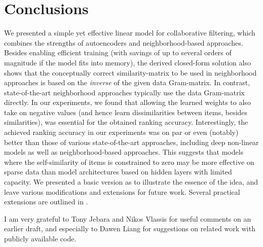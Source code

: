 \documentclass[sigconf]{acmart}
\begin{document}
\section{Conclusions}
We presented a simple yet effective linear model for collaborative filtering, which combines the strengths of autoencoders and neighborhood-based approaches.
 Besides enabling efficient training (with savings of up to several orders of magnitude  if the model fits into memory), the derived closed-form solution also shows that the conceptually correct similarity-matrix to be used in neighborhood approaches is based on the \emph{inverse} of the given data Gram-matrix. In contrast, state-of-the-art neighborhood approaches typically use the data Gram-matrix directly. In our experiments, we found that allowing the learned weights to also take on negative values (and hence learn dissimilarities between items, besides similarities), was essential for the obtained ranking accuracy. Interestingly, the achieved ranking accuracy in our experiments  was on par or even (notably) better than those of various state-of-the-art approaches, including deep non-linear models as well as neighborhood-based approaches. This suggests that models where the self-similarity of items is constrained to zero may be more effective on sparse data than model architectures based on hidden layers with limited capacity. We presented a basic version as to illustrate the essence of the idea, and leave various modifications  and extensions for future work. Several practical extensions are outlined in \cite{steck19b}.

 
\begin{acks}
 I am very grateful to Tony Jebara and  Nikos  Vlassis for useful comments on an earlier draft, and especially to  Dawen Liang for suggestions on related work with publicly available code.
\end{acks}
\end{document}
